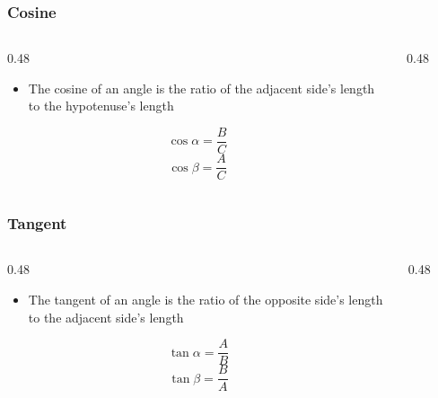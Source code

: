 \begin{frame}
	\frametitle{Cosine}
    \begin{columns}
        \begin{column}{0.48\linewidth}
            \begin{itemize}[<+- | alert@+>]
                \item The cosine of an angle is the ratio of the adjacent side's length to the hypotenuse's length
            \end{itemize}
            \[\cos \alpha = \dfrac{B}{C}\]
            \[\cos \beta = \dfrac{A}{C}\]
        \end{column}
        \begin{column}{0.48\linewidth}
            \begin{figure}
                \centering
                \resizebox{0.75\linewidth}{!}{
                    
                }
            \end{figure}
        \end{column}
    \end{columns}
\end{frame}

\begin{frame}
	\frametitle{Tangent}

    \begin{columns}
        \begin{column}{0.48\linewidth}
            \begin{itemize}[<+- | alert@+>]
                \item The tangent of an angle is the ratio of the opposite side's length to the adjacent side's length
            \end{itemize}
            \[\tan \alpha = \dfrac{A}{B}\]
            \[\tan \beta = \dfrac{B}{A}\]
        \end{column}
        \begin{column}{0.48\linewidth}
            \begin{figure}
                \centering
                \resizebox{0.75\linewidth}{!}{
                    
                }
            \end{figure}
        \end{column}
    \end{columns}
\end{frame}

